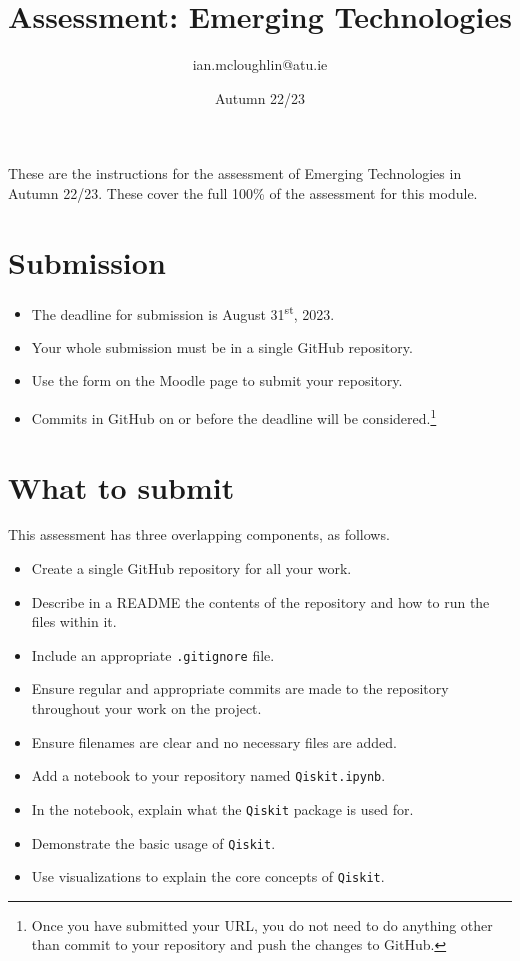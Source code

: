 \documentclass[a4paper]{tufte-handout}
\title{Assessment: Emerging Technologies}
\author{ian.mcloughlin@atu.ie}
\date{Autumn 22/23}
\begin{document}
 
\maketitle

These are the instructions for the assessment of Emerging Technologies in Autumn 22/23.
These cover the full 100\% of the assessment for this module.


\section{Submission}

\begin{itemize}
  \item The deadline for submission is August 31\textsuperscript{st}, 2023. 
  \item Your whole submission must be in a single GitHub repository.
  \item Use the form on the Moodle page to submit your repository.
  \item Commits in GitHub on or before the deadline will be considered.\footnote{Once you have submitted your URL, you do not need to do anything other than commit to your repository and push the changes to GitHub.}
\end{itemize}


\section{What to submit}
This assessment has three overlapping components, as follows.

\begin{itemize}
  \item Create a single GitHub repository for all your work.
  \item Describe in a README the contents of the repository and how to run the files within it.
  \item Include an appropriate \texttt{.gitignore} file.
  \item Ensure regular and appropriate commits are made to the repository throughout your work on the project.
  \item Ensure filenames are clear and no necessary files are added.
\end{itemize}

\begin{itemize}
  \item Add a notebook to your repository named \texttt{Qiskit.ipynb}.
  \item In the notebook, explain what the \texttt{Qiskit} package is used for.
  \item Demonstrate the basic usage of \texttt{Qiskit}.
  \item Use visualizations to explain the core concepts of \texttt{Qiskit}.
\end{itemize}
\end{document}

